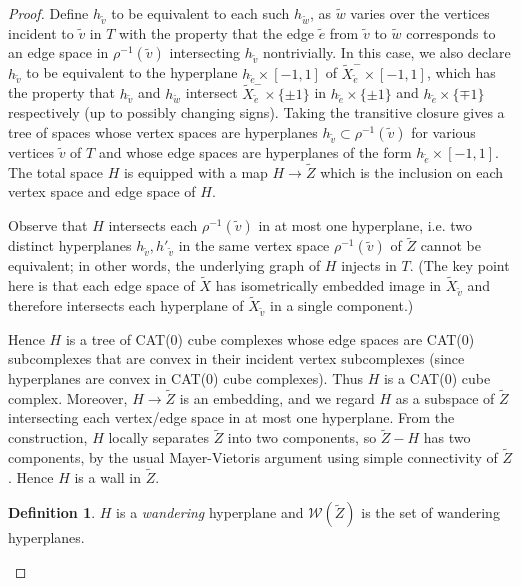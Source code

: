 \documentclass[11pt,oneside]{amsart}
\theoremstyle{definition}
\newtheorem{defn}[thm]{Definition}
\begin{document}
\begin{proof}
Define $h_{\tilde v}$ to be equivalent to each such $h_{\tilde w}$, as $\tilde w$ varies over the vertices incident to $\tilde v$ in $T$ with the property that the edge $\tilde e$ from $\tilde v$ to $\tilde w$ corresponds to an edge space in $\rho^{-1}(\tilde v)$ intersecting $h_{\tilde v}$ nontrivially.  In this case, we also declare $h_{\tilde v}$ to be equivalent to the hyperplane $h_{\tilde e}\times[-1,1]$ of $\widetilde X_{\tilde e}^-\times[-1,1]$, which has the property that $h_{\tilde v}$ and $h_{\tilde w}$ intersect $\widetilde X_{\tilde e}^-\times\{\pm 1\}$ in $h_{\tilde e}\times \{\pm1\}$ and $h_{\tilde e}\times\{\mp1\}$ respectively (up to possibly changing signs).  Taking the transitive closure gives a tree of spaces whose vertex spaces are hyperplanes $h_{\tilde v}\subset \rho^{-1}(\tilde v)$ for various vertices $\tilde v$ of $T$ and whose edge spaces are hyperplanes of the form $h_{\tilde e}\times [-1,1]$.  The total space $H$ is equipped with a map $H\to\widetilde Z$ which is the inclusion on each vertex space and edge space of $H$.  

Observe that $H$ intersects each $\rho^{-1}(\tilde v)$ in at most one hyperplane, i.e. two distinct hyperplanes $h_{\tilde v},h'_{\tilde v}$ in the same vertex space $\rho^{-1}(\tilde v)$ of $\widetilde Z$ cannot be equivalent; in other words, the underlying graph of $H$ injects in $T$.  (The key point here is that each edge space of $\widetilde X$ has isometrically embedded image in $\widetilde X_{\tilde v}$ and therefore intersects each hyperplane of $\widetilde X_{\tilde v}$ in a single component.)

Hence $H$ is a tree of CAT(0) cube complexes whose edge spaces are CAT(0) subcomplexes that are convex in their incident vertex subcomplexes (since hyperplanes are convex in CAT(0) cube complexes).  Thus $H$ is a CAT(0) cube complex.  Moreover, $H\to \widetilde Z$ is an embedding, and we regard $H$ as a subspace of $\widetilde Z$ intersecting each vertex/edge space in at most one hyperplane.  From the construction, $H$ locally separates $\widetilde Z$ into two components, so $\widetilde Z-H$ has two components, by the usual Mayer-Vietoris argument using simple connectivity of $\widetilde Z$.  Hence $H$ is a wall in $\widetilde Z$.  

\begin{defn}\label{defn:wandering-in-Z}
$H$ is a \emph{wandering} hyperplane and $\mathcal W(\widetilde Z)$ is the set of wandering hyperplanes.  
\end{defn}
    


\end{proof}
\end{document}
